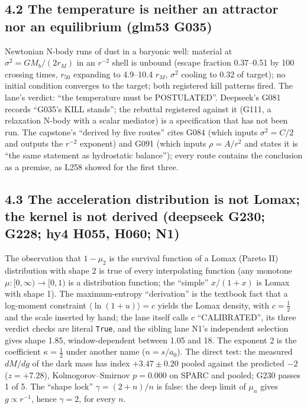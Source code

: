 \documentclass[
  11pt,
]{article}
\begin{document}
\subsection{4.2 The temperature is neither an attractor nor an
equilibrium (glm53
G035)}\label{the-temperature-is-neither-an-attractor-nor-an-equilibrium-glm53-g035}

Newtonian N-body runs of dust in a baryonic well: material at
\(\sigma^2 = G M_b/(2 r_M)\) in an \(r^{-2}\) shell is unbound (escape
fraction 0.37--0.51 by 100 crossing times, \(r_{50}\) expanding to
4.9--10.4 \(r_M\), \(\sigma^2\) cooling to 0.32 of target); no initial
condition converges to the target; both registered kill patterns fired.
The lane's verdict: ``the temperature must be POSTULATED''. Deepseek's
G081 records ``G035's KILL stands''; the rebuttal registered against it
(G111, a relaxation N-body with a scalar mediator) is a specification
that has not been run. The capstone's ``derived by five routes'' cites
G084 (which inputs \(\sigma^2 = C/2\) and outputs the \(r^{-2}\)
exponent) and G091 (which inputs \(\rho = A/r^2\) and states it is ``the
same statement as hydrostatic balance''); every route contains the
conclusion as a premise, as L258 showed for the first three.

\subsection{4.3 The acceleration distribution is not Lomax; the kernel
is not derived (deepseek G230; G228; hy4 H055, H060;
N1)}\label{the-acceleration-distribution-is-not-lomax-the-kernel-is-not-derived-deepseek-g230-g228-hy4-h055-h060-n1}

The observation that \(1 - \mu_2\) is the survival function of a Lomax
(Pareto II) distribution with shape 2 is true of every interpolating
function (any monotone \(\mu: [0,\infty) \to [0,1)\) is a distribution
function; the ``simple'' \(x/(1+x)\) is Lomax with shape 1). The
maximum-entropy ``derivation'' is the textbook fact that a log-moment
constraint \(\langle \ln(1+u) \rangle = c\) yields the Lomax density,
with \(c = \tfrac12\) and the scale inserted by hand; the lane itself
calls \(c\) ``CALIBRATED'', its three verdict checks are literal
\texttt{True}, and the sibling lane N1's independent selection gives
shape 1.85, window-dependent between 1.05 and 18. The exponent 2 is the
coefficient \(\kappa = \tfrac12\) under another name (\(n = s/a_0\)).
The direct test: the measured \(dM/dg\) of the dark mass has index
\(+3.47 \pm 0.20\) pooled against the predicted \(-2\) (\(z = +7.28\)),
Kolmogorov--Smirnov \(p = 0.000\) on SPARC and pooled; G230 passes 1 of
5. The ``shape lock'' \(\gamma = (2+n)/n\) is false: the deep limit of
\(\mu_n\) gives \(g \propto r^{-1}\), hence \(\gamma = 2\), for every
\(n\).
\end{document}
